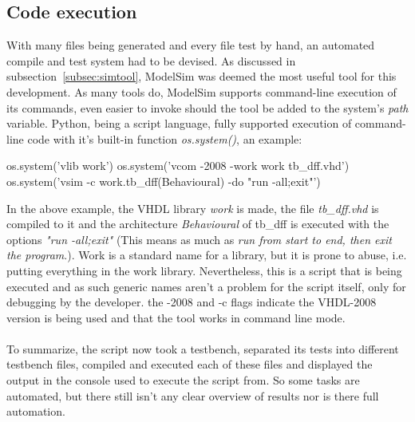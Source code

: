 \documentclass[11pt,british]{article}
\begin{document}
\subsection{Code execution}
With many files being generated and every file test by hand, an automated compile and test system had to be devised. As discussed in subsection~\ref{subsec:simtool}, ModelSim was deemed the most useful tool for this development. As many tools do, ModelSim supports command-line execution of its commands, even easier to invoke should the tool be added to the system's \emph{path} variable. Python, being a script language, fully supported execution of command-line code with it's built-in function \emph{os.system()}, an example:

\begin{python}
os.system('vlib work')
os.system('vcom -2008 -work work tb_dff.vhd')
os.system('vsim -c work.tb_dff(Behavioural) -do "run -all;exit"')
\end{python}

In the above example, the VHDL library \emph{work} is made, the file \emph{tb\_dff.vhd} is compiled to it and the architecture \emph{Behavioural} of tb\_dff is executed with the options \emph{"run -all;exit"} (This means as much as \emph{run from start to end, then exit the program}.). Work is a standard name for a library, but it is prone to abuse, i.e. putting everything in the work library. Nevertheless, this is a script that is being executed and as such generic names aren't a problem for the script itself, only for debugging by the developer. the -2008 and -c flags indicate the VHDL-2008 version is being used and that the tool works in command line mode.\\
\\
To summarize, the script now took a testbench, separated its tests into different testbench files, compiled and executed each of these files and displayed the output in the console used to execute the script from. So some tasks are automated, but there still isn't any clear overview of results nor is there full automation.
\end{document}
